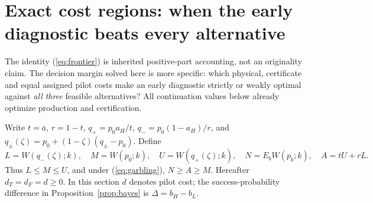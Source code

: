 \section{Exact cost regions: when the early diagnostic beats every alternative}\label{sec:regions}
The identity (\ref{eq:frontier}) is inherited positive-part accounting, not an originality claim. The decision margin solved here is more specific: which physical, certificate and equal assigned pilot costs make an early diagnostic strictly or weakly optimal against \emph{all three} feasible alternatives? All continuation values below already optimize production and certification.

Write $t=\bar a$, $r=1-t$, $q_+=p_0a_H/t$, $q_-=p_0(1-a_H)/r$, and $q_\pm(\zeta)=p_0+(1-\zeta)(q_\pm-p_0)$. Define
\begin{equation}
 L=W(q_-(\zeta);k),\quad M=W(p_0;k),\quad U=W(q_+(\zeta);k),\quad N=E_bW(p_b;k),\quad A=tU+rL.\label{eq:LMUN}
\end{equation}
Thus $L\leq M\leq U$, and under (\ref{eq:garbling}), $N\geq A\geq M$. Hereafter $d_T=d_F=d\geq0$. In this section $d$ denotes pilot cost; the success-probability difference in Proposition~\ref{prop:bayes} is $\Delta=b_H-b_L$.


